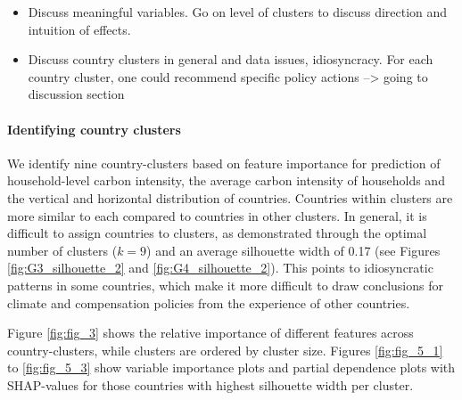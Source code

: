 \documentclass[12pt, a4paper]{article}
\begin{document}

\begin{itemize}
    \item Discuss meaningful variables. Go on level of clusters to discuss direction and intuition of effects.
    \item Discuss country clusters in general and data issues, idiosyncracy. For each country cluster, one could recommend specific policy actions --> going to discussion section
\end{itemize}

\paragraph{Identifying country clusters}

We identify nine country-clusters based on feature importance for prediction of household-level carbon intensity, the average carbon intensity of households and the vertical and horizontal distribution of countries. Countries within clusters are more similar to each compared to countries in other clusters. In general, it is difficult to assign countries to clusters, as demonstrated through the optimal number of clusters ($k=9$) and an average silhouette width of 0.17 (see Figures \ref{fig:G3_silhouette_2} and \ref{fig:G4_silhouette_2}). This points to idiosyncratic patterns in some countries, which make it more difficult to draw conclusions for climate and compensation policies from the experience of other countries. 

Figure \ref{fig:fig_3} shows the relative importance of different features across country-clusters, while clusters are ordered by cluster size. Figures \ref{fig:fig_5_1} to \ref{fig:fig_5_3} show variable importance plots and partial dependence plots with SHAP-values for those countries with highest silhouette width per cluster.
\end{document}
